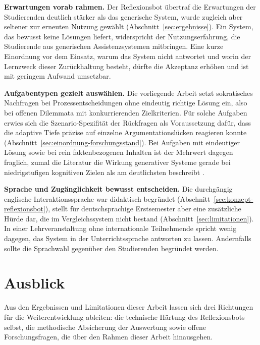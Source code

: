 \textbf{Erwartungen vorab rahmen.} Der Reflexionsbot übertraf die Erwartungen der Studierenden
deutlich stärker als das generische System, wurde zugleich aber seltener zur erneuten Nutzung gewählt
(Abschnitt~\ref{sec:ergebnisse}). Ein System, das bewusst keine Lösungen liefert, widerspricht der
Nutzungserfahrung, die Studierende aus generischen Assistenzsystemen mitbringen. Eine kurze
Einordnung vor dem Einsatz, warum das System nicht antwortet und worin der Lernzweck dieser
Zurückhaltung besteht, dürfte die Akzeptanz erhöhen und ist mit geringem Aufwand umsetzbar.

\textbf{Aufgabentypen gezielt auswählen.} Die vorliegende Arbeit setzt sokratisches Nachfragen bei
Prozessentscheidungen ohne eindeutig richtige Lösung ein, also bei offenen Dilemmata mit konkurrierenden
Zielkriterien. Für solche Aufgaben erwies sich die Szenario-Spezifität der Rückfragen als Voraussetzung
dafür, dass die adaptive Tiefe präzise auf einzelne Argumentationslücken reagieren konnte
(Abschnitt~\ref{sec:einordnung-forschungsstand}). Bei Aufgaben mit eindeutiger Lösung sowie bei rein
faktenbezogenen Inhalten ist der Mehrwert dagegen fraglich, zumal die Literatur die Wirkung
generativer Systeme gerade bei niedrigstufigen kognitiven Zielen als am deutlichsten beschreibt
\cite{GenerativeAITools}.

\textbf{Sprache und Zugänglichkeit bewusst entscheiden.} Die durchgängig englische Interaktionssprache
war didaktisch begründet (Abschnitt~\ref{sec:konzept-reflexionsbot}), stellt für deutschsprachige
Erstsemester aber eine zusätzliche Hürde dar, die im Vergleichssystem nicht bestand
(Abschnitt~\ref{sec:limitationen}). In einer Lehrveranstaltung ohne internationale Teilnehmende
spricht wenig dagegen, das System in der Unterrichtssprache antworten zu lassen. Andernfalls sollte
die Sprachwahl gegenüber den Studierenden begründet werden.

\section{Ausblick}
\label{sec:ausblick}

Aus den Ergebnissen und Limitationen dieser Arbeit lassen sich drei Richtungen für die
Weiterentwicklung ableiten: die technische Härtung des Reflexionsbots selbst, die methodische
Absicherung der Auswertung sowie offene Forschungsfragen, die über den Rahmen dieser Arbeit
hinausgehen.

